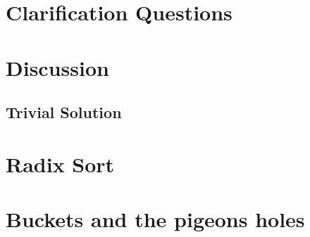 \section{Clarification Questions}

\begin{QandA}
	\item 
	\begin{answered}
		\textit{}
	\end{answered}
	
\end{QandA}

\section{Discussion}
\label{max_gap:sec:discussion}


\subsection{Trivial Solution}
\label{max_gap:sec:trivial}

\begin{minipage}{\linewidth}
	
\end{minipage}


\section{Radix Sort}
\label{max_gap:sec:radix_sort}

\section{Buckets and the pigeons holes}
\label{max_gap:sec:buckets}